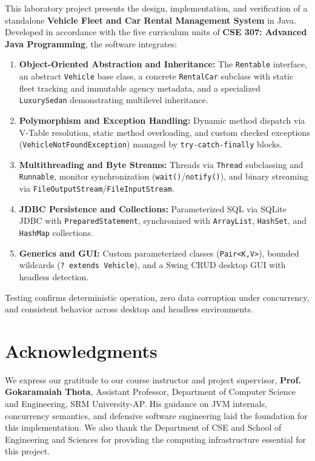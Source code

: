 \documentclass[11pt,a4paper]{article}
\begin{document}
This laboratory project presents the design, implementation, and verification of a standalone \textbf{Vehicle Fleet and Car Rental Management System} in Java. Developed in accordance with the five curriculum units of \textbf{CSE 307: Advanced Java Programming}, the software integrates:
\begin{enumerate}
    \item \textbf{Object-Oriented Abstraction and Inheritance:} The \texttt{Rentable} interface, an abstract \texttt{Vehicle} base class, a concrete \texttt{RentalCar} subclass with static fleet tracking and immutable agency metadata, and a specialized \texttt{LuxurySedan} demonstrating multilevel inheritance.
    \item \textbf{Polymorphism and Exception Handling:} Dynamic method dispatch via V-Table resolution, static method overloading, and custom checked exceptions (\texttt{VehicleNotFoundException}) managed by \texttt{try-catch-finally} blocks.
    \item \textbf{Multithreading and Byte Streams:} Threads via \texttt{Thread} subclassing and \texttt{Runnable}, monitor synchronization (\texttt{wait()}/\texttt{notify()}), and binary streaming via \texttt{FileOutputStream}/\texttt{FileInputStream}.
    \item \textbf{JDBC Persistence and Collections:} Parameterized SQL via SQLite JDBC with \texttt{PreparedStatement}, synchronized with \texttt{ArrayList}, \texttt{HashSet}, and \texttt{HashMap} collections.
    \item \textbf{Generics and GUI:} Custom parameterized classes (\texttt{Pair<K,V>}), bounded wildcards (\texttt{? extends Vehicle}), and a Swing CRUD desktop GUI with headless detection.
\end{enumerate}
Testing confirms deterministic operation, zero data corruption under concurrency, and consistent behavior across desktop and headless environments.

\vspace{1.2cm}

\section*{Acknowledgments}

We express our gratitude to our course instructor and project supervisor, \textbf{Prof. Gokaramaiah Thota}, Assistant Professor, Department of Computer Science and Engineering, SRM University-AP. His guidance on JVM internals, concurrency semantics, and defensive software engineering laid the foundation for this implementation. We also thank the Department of CSE and School of Engineering and Sciences for providing the computing infrastructure essential for this project.
\end{document}
